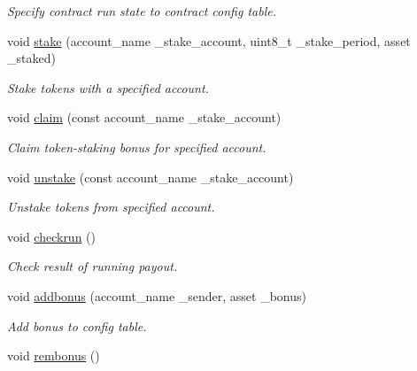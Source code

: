 \begin{DoxyCompactItemize}
\begin{DoxyCompactList}\small\item\em Specify contract run state to contract config table. \end{DoxyCompactList}\item 
void \hyperlink{classboidtoken_af7c0a3fb8818ba690fb053f585026fbb}{stake} (account\+\_\+name \+\_\+stake\+\_\+account, uint8\+\_\+t \+\_\+stake\+\_\+period, asset \+\_\+staked)
\begin{DoxyCompactList}\small\item\em Stake tokens with a specified account. \end{DoxyCompactList}\item 
void \hyperlink{classboidtoken_a25a781212d8a51b13ffa5fa8b899fe8a}{claim} (const account\+\_\+name \+\_\+stake\+\_\+account)
\begin{DoxyCompactList}\small\item\em Claim token-\/staking bonus for specified account. \end{DoxyCompactList}\item 
void \hyperlink{classboidtoken_a53added7a70af2b440581b6f26a57e9f}{unstake} (const account\+\_\+name \+\_\+stake\+\_\+account)
\begin{DoxyCompactList}\small\item\em Unstake tokens from specified account. \end{DoxyCompactList}\item 
void \hyperlink{classboidtoken_ab0897d090230a13a8e5c272bb6ef849d}{checkrun} ()
\begin{DoxyCompactList}\small\item\em Check result of running payout. \end{DoxyCompactList}\item 
void \hyperlink{classboidtoken_ab39151bdead8e592f1d422adf104eebd}{addbonus} (account\+\_\+name \+\_\+sender, asset \+\_\+bonus)\hypertarget{classboidtoken_ab39151bdead8e592f1d422adf104eebd}{}\label{classboidtoken_ab39151bdead8e592f1d422adf104eebd}

\begin{DoxyCompactList}\small\item\em Add bonus to config table. \end{DoxyCompactList}\item 
void \hyperlink{classboidtoken_a828013f2944964600d083ea990684edd}{rembonus} ()\hypertarget{classboidtoken_a828013f2944964600d083ea990684edd}{}\label{classboidtoken_a828013f2944964600d083ea990684edd}


\end{DoxyCompactItemize}
